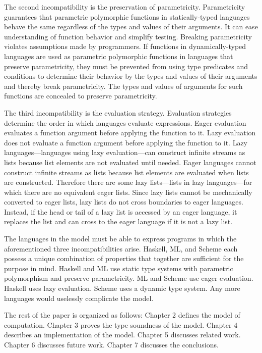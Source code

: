 The second incompatibility is the preservation of parametricity.  Parametricity guarantees that parametric polymorphic functions in statically-typed languages behave the same regardless of the types and values of their arguments.  It can ease understanding of function behavior and simplify testing.  Breaking parametricity violates assumptions made by programmers.  If functions in dynamically-typed languages are used as parametric polymorphic functions in languages that preserve parametricity, they must be prevented from using type predicates and conditions to determine their behavior by the types and values of their arguments and thereby break parametricity.  The types and values of arguments for such functions are concealed to preserve parametricity.

The third incompatibility is the evaluation strategy.  Evaluation strategies determine the order in which languages evaluate expressions.  Eager evaluation evaluates a function argument before applying the function to it.  Lazy evaluation does not evaluate a function argument before applying the function to it.  Lazy languages---languages using lazy evaluation---can construct infinite streams as lists because list elements are not evaluated until needed.  Eager languages cannot construct infinite streams as lists because list elements are evaluated when lists are constructed.  Therefore there are some lazy lists---lists in lazy languages---for which there are no equivalent eager lists.  Since lazy lists cannot be mechanically converted to eager lists, lazy lists do not cross boundaries to eager languages.  Instead, if the head or tail of a lazy list is accessed by an eager language, it replaces the list and can cross to the eager language if it is not a lazy list.

The languages in the model must be able to express programs in which the aforementioned three incompatibilities arise.  Haskell, ML, and Scheme each possess a unique combination of properties that together are sufficient for the purpose in mind.  Haskell and ML use static type systems with parametric polymorphism and preserve parametricity.  ML and Scheme use eager evaluation.  Haskell uses lazy evaluation.  Scheme uses a dynamic type system.  Any more languages would uselessly complicate the model.

The rest of the paper is organized as follows: Chapter 2 defines the model of computation.  Chapter 3 proves the type soundness of the model.  Chapter 4 describes an implementation of the model.  Chapter 5 discusses related work.  Chapter 6 discusses future work.  Chapter 7 discusses the conclusions.